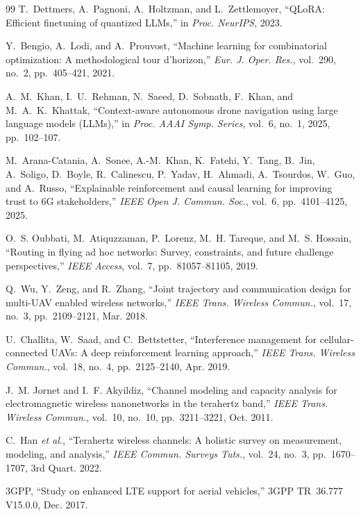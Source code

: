 \documentclass[journal]{IEEEtran}
\begin{document}
\begin{thebibliography}{99}
T.~Dettmers, A.~Pagnoni, A.~Holtzman, and L.~Zettlemoyer, ``QLoRA: Efficient finetuning of quantized LLMs,'' in \textit{Proc. NeurIPS}, 2023.

Y.~Bengio, A.~Lodi, and A.~Prouvost, ``Machine learning for combinatorial optimization: A methodological tour d'horizon,'' \textit{Eur. J. Oper. Res.}, vol.~290, no.~2, pp.~405--421, 2021.

A.~M.~Khan, I.~U.~Rehman, N.~Saeed, D.~Sobnath, F.~Khan, and M.~A.~K.~Khattak, ``Context-aware autonomous drone navigation using large language models (LLMs),'' in \textit{Proc. AAAI Symp. Series}, vol.~6, no.~1, 2025, pp.~102--107.

M.~Arana-Catania, A.~Sonee, A.-M.~Khan, K.~Fatehi, Y.~Tang, B.~Jin, A.~Soligo, D.~Boyle, R.~Calinescu, P.~Yadav, H.~Ahmadi, A.~Tsourdos, W.~Guo, and A.~Russo, ``Explainable reinforcement and causal learning for improving trust to 6G stakeholders,'' \textit{IEEE Open J. Commun. Soc.}, vol.~6, pp.~4101--4125, 2025.

O.~S. Oubbati, M.~Atiquzzaman, P.~Lorenz, M.~H. Tareque, and M.~S. Hossain, ``Routing in flying ad hoc networks: Survey, constraints, and future challenge perspectives,'' \textit{IEEE Access}, vol.~7, pp.~81057--81105, 2019.

Q.~Wu, Y.~Zeng, and R.~Zhang, ``Joint trajectory and communication design for multi-UAV enabled wireless networks,'' \textit{IEEE Trans. Wireless Commun.}, vol.~17, no.~3, pp.~2109--2121, Mar. 2018.

U.~Challita, W.~Saad, and C.~Bettstetter, ``Interference management for cellular-connected UAVs: A deep reinforcement learning approach,'' \textit{IEEE Trans. Wireless Commun.}, vol.~18, no.~4, pp.~2125--2140, Apr. 2019.

J.~M. Jornet and I.~F. Akyildiz, ``Channel modeling and capacity analysis for electromagnetic wireless nanonetworks in the terahertz band,'' \textit{IEEE Trans. Wireless Commun.}, vol.~10, no.~10, pp.~3211--3221, Oct. 2011.

C.~Han \textit{et al.}, ``Terahertz wireless channels: A holistic survey on measurement, modeling, and analysis,'' \textit{IEEE Commun. Surveys Tuts.}, vol.~24, no.~3, pp.~1670--1707, 3rd Quart. 2022.

3GPP, ``Study on enhanced LTE support for aerial vehicles,'' 3GPP TR~36.777 V15.0.0, Dec. 2017.


\end{thebibliography}
\end{document}
